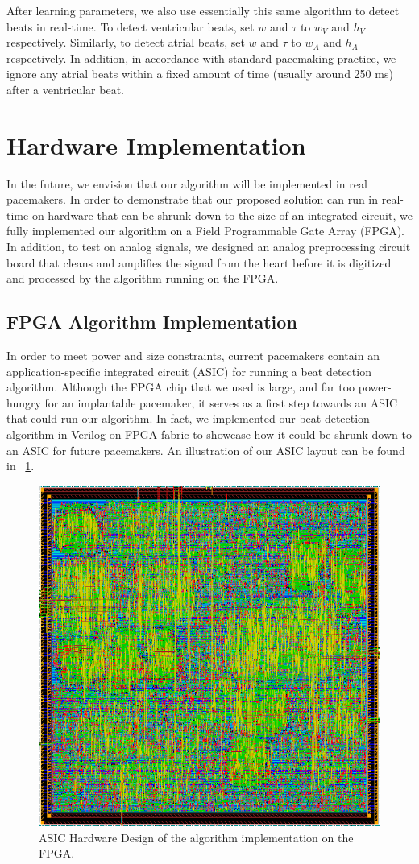 \documentclass[conference]{IEEEtran}
\newcommand{\APW}{\ensuremath{w_A}}
\newcommand{\VPW}{\ensuremath{w_V}}
\newcommand{\APH}{\ensuremath{h_A}}
\newcommand{\VPH}{\ensuremath{h_V}}
\begin{document}
After learning parameters, we also use essentially this same algorithm to detect beats in real-time.
To detect ventricular beats, set $w$ and $\tau$ to \VPW{} and \VPH{} respectively.
Similarly, to detect atrial beats, set $w$ and $\tau$ to \APW{} and \APH{} respectively.
In addition, in accordance with standard pacemaking practice, we ignore any atrial beats within a fixed amount of time (usually around 250 ms) after
a ventricular beat.

\section{Hardware Implementation}
In the future, we envision that our algorithm will be
implemented in real pacemakers. In order to
demonstrate that our proposed solution can run in
real-time on hardware that can be shrunk down to
the size of an integrated circuit, we fully implemented
our algorithm on a Field Programmable Gate Array
(FPGA).
In addition, to test on analog signals, we
designed an analog preprocessing circuit board that cleans and
amplifies the signal from the heart before it is digitized and processed
by the algorithm running on the FPGA.

\subsection{FPGA Algorithm Implementation}
In order to meet power and size constraints, 
current pacemakers contain an application-specific integrated circuit (ASIC) for running a beat detection algorithm.
Although the FPGA chip that we used is large, and far too power-hungry for an implantable pacemaker,
it serves as a first step towards an ASIC that could run our algorithm.
In fact, we implemented our beat detection algorithm in Verilog on FPGA fabric to
showcase how it could be shrunk down to an ASIC for future pacemakers.
An illustration of our ASIC
layout can be found in \figurename~\ref{fig:fpga}.
\begin{figure}[h]
	\centering
	\includegraphics[width=.3\columnwidth]{fpga.png}
	\caption{ASIC Hardware Design of the algorithm implementation on the FPGA.}
	\label{fig:fpga}
\end{figure}
\end{document}
